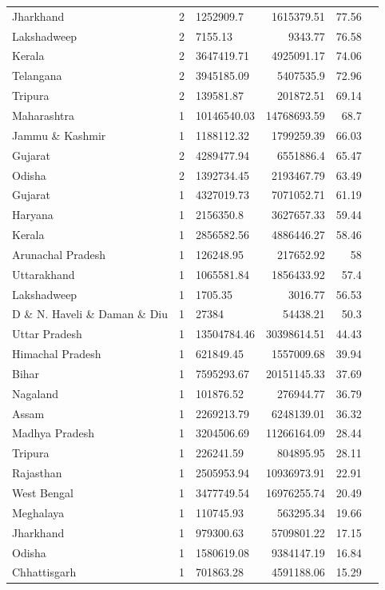 \documentclass{article}
\begin{document}
\begin{table}[h!]
{\begin{tabular}{|l|l|l|r|r|r|}
		Jharkhand            & 2 & 1252909.7   & 1615379.51  & 77.56 \\
		Lakshadweep          & 2 & 7155.13     & 9343.77     & 76.58 \\
		Kerala               & 2 & 3647419.71  & 4925091.17  & 74.06 \\
		Telangana            & 2 & 3945185.09  & 5407535.9   & 72.96 \\
		Tripura              & 2 & 139581.87   & 201872.51   & 69.14 \\
		Maharashtra          & 1 & 10146540.03 & 14768693.59 & 68.7  \\
		Jammu \& Kashmir     & 1 & 1188112.32  & 1799259.39  & 66.03 \\
		Gujarat              & 2 & 4289477.94  & 6551886.4   & 65.47 \\
		Odisha               & 2 & 1392734.45  & 2193467.79  & 63.49 \\
		Gujarat              & 1 & 4327019.73  & 7071052.71  & 61.19 \\
		Haryana              & 1 & 2156350.8   & 3627657.33  & 59.44 \\
		Kerala               & 1 & 2856582.56  & 4886446.27  & 58.46 \\
		Arunachal Pradesh    & 1 & 126248.95   & 217652.92   & 58    \\
		Uttarakhand          & 1 & 1065581.84  & 1856433.92  & 57.4  \\
		Lakshadweep          & 1 & 1705.35     & 3016.77     & 56.53 \\
		D \& N. Haveli \& Daman \& Diu & 1      & 27384                & 54438.21                    & 50.3              \\
		Uttar Pradesh        & 1 & 13504784.46 & 30398614.51 & 44.43 \\
		Himachal Pradesh     & 1 & 621849.45   & 1557009.68  & 39.94 \\
		Bihar                & 1 & 7595293.67  & 20151145.33 & 37.69 \\
		Nagaland             & 1 & 101876.52   & 276944.77   & 36.79 \\
		Assam                & 1 & 2269213.79  & 6248139.01  & 36.32 \\
		Madhya Pradesh       & 1 & 3204506.69  & 11266164.09 & 28.44 \\
		Tripura              & 1 & 226241.59   & 804895.95   & 28.11 \\
		Rajasthan            & 1 & 2505953.94  & 10936973.91 & 22.91 \\
		West Bengal          & 1 & 3477749.54  & 16976255.74 & 20.49 \\
		Meghalaya            & 1 & 110745.93   & 563295.34   & 19.66 \\
		Jharkhand            & 1 & 979300.63   & 5709801.22  & 17.15 \\
		Odisha               & 1 & 1580619.08  & 9384147.19  & 16.84 \\
		Chhattisgarh         & 1 & 701863.28   & 4591188.06  & 15.29\\
		\hline
	\end{tabular}
}
\end{table}
\end{document}
